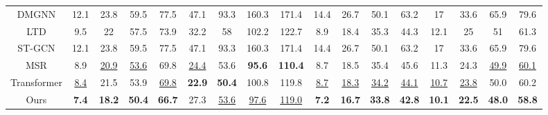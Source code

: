 \begin{table}[h]
{\begin{tabular}{c|cccc|cccc|cccc|cccc}
DMGNN       & 12.1          & 23.8          & 59.5          & 77.5          & 47.1          & 93.3          & 160.3         & 171.4          & 14.4          & 26.7          & 50.1          & 63.2          & 17            & 33.6          & 65.9          & 79.6          \\
LTD   & 9.5           & 22            & 57.5          & 73.9          & 32.2          & 58            & 102.2         & 122.7          & 8.9           & 18.4          & 35.3          & 44.3          & 12.1          & 25            & 51            & 61.3          \\
ST-GCN       & 12.1          & 23.8          & 59.5          & 77.5          & 47.1          & 93.3          & 160.3         & 171.4          & 14.4          & 26.7          & 50.1          & 63.2          & 17            & 33.6          & 65.9          & 79.6          \\
MSR   & 8.9           & \underline{20.9}          & \underline{53.6}          & 69.8          & \underline{24.4}          & 53.6          & \textbf{95.6} & \textbf{110.4} & 8.7           & 18.5          & 35.4          & 45.6          & 11.3          & 24.3          & \underline{49.9}          & \underline{60.1}          \\
Transformer & \underline{8.4}           & 21.5          & 53.9          & \underline{69.8}          & \textbf{22.9}          & \textbf{50.4}          & 100.8         & 119.8          & \underline{8.7}           & \underline{18.3}          & \underline{34.2}          & \underline{44.1}          & \underline{10.7}          & \underline{23.8}          & 50.0          & 60.2          \\
Ours   & \textbf{7.4}  & \textbf{18.2} & \textbf{50.4} & \textbf{66.7} & 27.3 & \underline{53.6} & \underline{97.6}          & \underline{119.0}          & \textbf{7.2}  & \textbf{16.7} & \textbf{33.8} & \textbf{42.8} & \textbf{10.1} & \textbf{22.5} & \textbf{48.0} & \textbf{58.8} \\ \hline
\end{tabular}
}

\label{table:human3.6 short-term 8}
\end{table}


